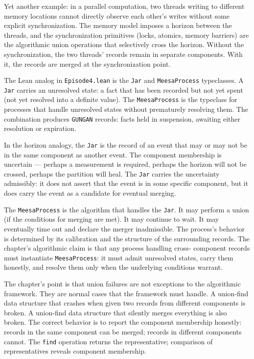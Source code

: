 Yet another example: in a parallel computation, two threads writing
to different memory locations cannot directly observe each other's
writes without some explicit synchronization. The memory model
imposes a horizon between the threads, and the synchronization
primitives (locks, atomics, memory barriers) are the algorithmic
union operations that selectively cross the horizon. Without the
synchronization, the two threads' records remain in separate
components. With it, the records are merged at the synchronization
point.

The Lean analog in \texttt{Episode4.lean} is the \texttt{Jar} and
\texttt{MeesaProcess} typeclasses. A \texttt{Jar} carries an unresolved
state: a fact that has been recorded but not yet spent (not yet
resolved into a definite value). The \texttt{MeesaProcess} is the
typeclass for processes that handle unresolved states without
prematurely resolving them. The combination produces \texttt{GUNGAN}
records: facts held in suspension, awaiting either resolution or
expiration.

In the horizon analogy, the \texttt{Jar} is the record of an event
that may or may not be in the same component as another event. The
component membership is uncertain --- perhaps a measurement is
required, perhaps the horizon will not be crossed, perhaps the
partition will heal. The \texttt{Jar} carries the uncertainty
admissibly: it does not assert that the event is in some specific
component, but it does carry the event as a candidate for eventual
merging.

The \texttt{MeesaProcess} is the algorithm that handles the
\texttt{Jar}. It may perform a union (if the conditions for merging
are met). It may continue to wait. It may eventually time out and
declare the merger inadmissible. The process's behavior is determined
by its calibration and the structure of the surrounding records. The
chapter's algorithmic claim is that any process handling cross-
component records must instantiate \texttt{MeesaProcess}: it must
admit unresolved states, carry them honestly, and resolve them only
when the underlying conditions warrant.

The chapter's point is that union failures are not exceptions to the
algorithmic framework. They are normal cases that the framework must
handle. A union-find data structure that crashes when given two
records from different components is broken. A union-find data
structure that silently merges everything is also broken. The
correct behavior is to report the component membership honestly:
records in the same component can be merged; records in different
components cannot. The \texttt{find} operation returns the
representative; comparison of representatives reveals component
membership.

